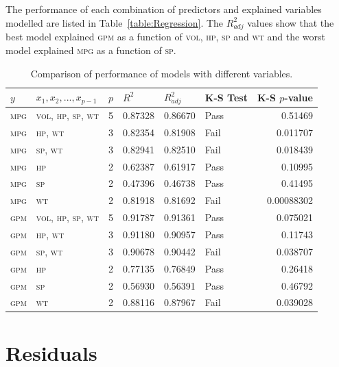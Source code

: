 \documentclass[a4paper,10pt,twocolumn]{article}
\newcommand{\MPG}{\textsc{mpg}\xspace}
\newcommand{\GPM}{\textsc{gpm}\xspace}
\newcommand{\VOL}{\textsc{vol}\xspace}
\newcommand{\HP}{\textsc{hp}\xspace}
\newcommand{\SP}{\textsc{sp}\xspace}
\newcommand{\WT}{\textsc{wt}\xspace}
\begin{document}
The performance of each combination of predictors and explained variables 
modelled are listed in Table~\vref{table:Regression}. The $R_{adj}^2$ values 
show that the best model explained \GPM as a function of \VOL, \HP, \SP and 
\WT and the worst model explained \MPG as a function of \SP.

\begin{table}
    \centering
    \caption{Comparison of performance of models with different variables. 
        \vspace{-\parsep}}
    \label{table:Regression}
    \begin{tabular}{llrrrlr}
        \toprule
        $y$ & $x_1, x_2, ..., x_{p-1}$ & 
        \multicolumn{1}{l}{$p$} & 
        \multicolumn{1}{l}{$R^2$} & 
        \multicolumn{1}{l}{$R_{adj}^2$} & 
        K-S Test & 
        \multicolumn{1}{l}{K-S $p$-value} \\
        \midrule
        \MPG & \VOL, \HP, \SP, \WT & 5 & 0.87328 & 0.86670 & Pass & 0.51469 \\
        \MPG & \HP, \WT            & 3 & 0.82354 & 0.81908 & Fail & 0.011707 \\
        \MPG & \SP, \WT            & 3 & 0.82941 & 0.82510 & Fail & 0.018439 \\
        \MPG & \HP                 & 2 & 0.62387 & 0.61917 & Pass & 0.10995 \\
        \MPG & \SP                 & 2 & 0.47396 & 0.46738 & Pass & 0.41495 \\
        \MPG & \WT                 & 2 & 0.81918 & 0.81692 & Fail & 0.00088302\\
        \GPM & \VOL, \HP, \SP, \WT & 5 & 0.91787 & 0.91361 & Pass & 0.075021 \\
        \GPM & \HP, \WT            & 3 & 0.91180 & 0.90957 & Pass & 0.11743 \\
        \GPM & \SP, \WT            & 3 & 0.90678 & 0.90442 & Fail & 0.038707 \\
        \GPM & \HP                 & 2 & 0.77135 & 0.76849 & Pass & 0.26418 \\
        \GPM & \SP                 & 2 & 0.56930 & 0.56391 & Pass & 0.46792 \\
        \GPM & \WT                 & 2 & 0.88116 & 0.87967 & Fail & 0.039028 \\
        \bottomrule
    \end{tabular}
\end{table}
    
\section{Residuals}
\end{document}
